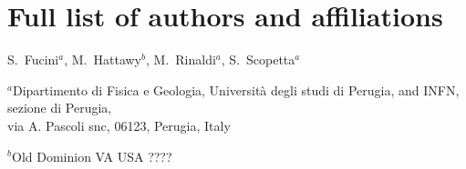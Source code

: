 \documentclass[times, twoside]{PosWhiPap}
\begin{document}
\onecolumn
\newpage



\captionsetup*{format=largeformat}
\section{Full list of authors and affiliations} \label{note:Note1} 

S.~Fucini$^a$, M.~Hattawy$^b$, M.~Rinaldi$^a$, S.~Scopetta$^a$  

\begin{center}

{\it

$^a${Dipartimento di Fisica e Geologia, Università degli studi di Perugia, and INFN, sezione di Perugia, \\
via A. Pascoli snc, 06123, Perugia, Italy}

$^b${Old Dominion VA USA ????}
}
\end{center}

\end{document}

